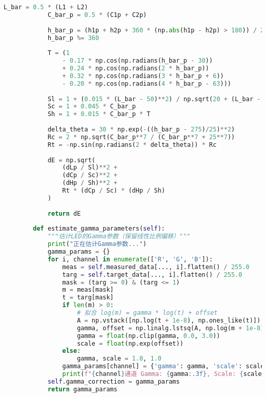 \begin{lstlisting}[language=Python]
            L_bar = 0.5 * (L1 + L2)
            C_bar_p = 0.5 * (C1p + C2p)
    
            h_bar_p = (h1p + h2p + 360 * (np.abs(h1p - h2p) > 180)) / 2
            h_bar_p %= 360
    
            T = (1
                - 0.17 * np.cos(np.radians(h_bar_p - 30))
                + 0.24 * np.cos(np.radians(2 * h_bar_p))
                + 0.32 * np.cos(np.radians(3 * h_bar_p + 6))
                - 0.20 * np.cos(np.radians(4 * h_bar_p - 63)))
    
            Sl = 1 + (0.015 * (L_bar - 50)**2) / np.sqrt(20 + (L_bar - 50)**2)
            Sc = 1 + 0.045 * C_bar_p
            Sh = 1 + 0.015 * C_bar_p * T
    
            delta_theta = 30 * np.exp(-((h_bar_p - 275)/25)**2)
            Rc = 2 * np.sqrt(C_bar_p**7 / (C_bar_p**7 + 25**7))
            Rt = -np.sin(np.radians(2 * delta_theta)) * Rc
    
            dE = np.sqrt(
                (dLp / Sl)**2 +
                (dCp / Sc)**2 +
                (dHp / Sh)**2 +
                Rt * (dCp / Sc) * (dHp / Sh)
            )
    
            return dE
        
        def estimate_gamma_parameters(self):
            """估计LED的Gamma参数（保留线性比例偏移）"""
            print("正在估计Gamma参数...")
            gamma_params = {}
            for i, channel in enumerate(['R', 'G', 'B']):
                meas = self.measured_data[..., i].flatten() / 255.0
                targ = self.target_data[..., i].flatten() / 255.0
                mask = (targ >= 0) & (targ <= 1)
                m = meas[mask]
                t = targ[mask]
                if len(m) > 0:
                    # 拟合 log(m) = gamma * log(t) + offset
                    A = np.vstack([np.log(t + 1e-8), np.ones_like(t)]).T
                    gamma, offset = np.linalg.lstsq(A, np.log(m + 1e-8), rcond=None)[0]
                    gamma = float(np.clip(gamma, 0.0, 3.0))
                    scale = float(np.exp(offset))
                else:
                    gamma, scale = 1.0, 1.0
                gamma_params[channel] = {'gamma': gamma, 'scale': scale}
                print(f"{channel}通道 Gamma: {gamma:.3f}, Scale: {scale:.3f}")
            self.gamma_correction = gamma_params
            return gamma_params
    

\end{lstlisting}
